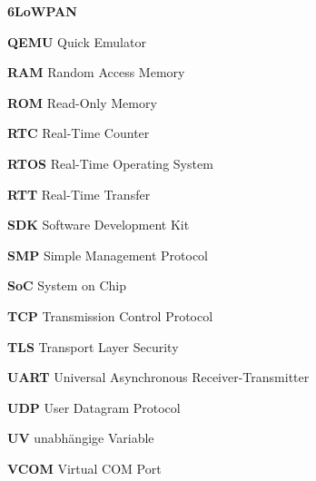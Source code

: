 \begin{abbreviations}{\textbf{6LoWPAN}}
  \item[\textbf{QEMU}] Quick Emulator
  \item[\textbf{RAM}] Random Access Memory
  \item[\textbf{ROM}] Read-Only Memory
  \item[\textbf{RTC}] Real-Time Counter
  \item[\textbf{RTOS}] Real-Time Operating System
  \item[\textbf{RTT}] Real-Time Transfer
  \item[\textbf{SDK}] Software Development Kit
  \item[\textbf{SMP}] Simple Management Protocol
  \item[\textbf{SoC}] System on Chip
  \item[\textbf{TCP}] Transmission Control Protocol
  \item[\textbf{TLS}] Transport Layer Security
  \item[\textbf{UART}] Universal Asynchronous Receiver-Transmitter
  \item[\textbf{UDP}] User Datagram Protocol
  \item[\textbf{UV}] unabh\"angige Variable
  \item[\textbf{VCOM}] Virtual COM Port
\end{abbreviations}
